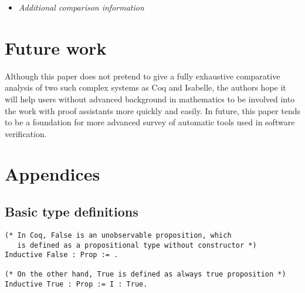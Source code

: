 \documentclass[article]{aaltoseries}
\begin{document}
\begin{itemize}
  \item \textit{Additional comparison information}
      
    
  
\end{itemize}



\section{Future work}
\label{sec:future_work}

Although this paper does not pretend to give a fully exhaustive comparative analysis of two such complex systems as Coq and Isabelle, the authors hope it will help users without advanced background in mathematics to be involved into the work with proof assistants more quickly and easily. In future, this paper tends to be a foundation for more advanced survey of automatic tools used in software verification.






\newpage
\appendix
\section*{Appendices}
\renewcommand{\thesubsection}{A.\arabic{subsection}}


\subsection{Basic type definitions}
\label{apx:type_definitions}

\begin{lstlisting}[language=coq,
  caption={Basic \texttt{Prop} types definitions in Coq},
  label={ex_typedef_prop_coq}]
(* In Coq, False is an unobservable proposition, which
   is defined as a propositional type without constructor *)
Inductive False : Prop := .

(* On the other hand, True is defined as always true proposition *)
Inductive True : Prop := I : True.
\end{lstlisting}
\end{document}

